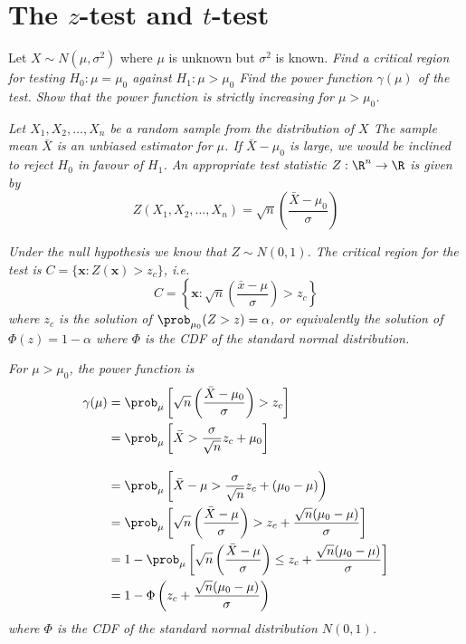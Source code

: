 
\section{The $z$-test and $t$-test}
\begin{example}
Let $X\sim N(\mu,\sigma^2)$ where $\mu$ is unknown but $\sigma^2$ is known. 
\ben
\it Find a critical region for testing $H_0:\mu=\mu_0$ against $H_1:\mu > \mu_0$
\it Find the power function $\gamma(\mu)$ of the test.
\it Show that the power function is strictly increasing for $\mu>\mu_0$.
\een
\end{example}

\begin{solution}
\ben
\it %
Let $X_1,X_2,\ldots,X_n$ be a random sample from the distribution of $X$
\bit
\it The sample mean $\bar{X}$ is an unbiased estimator for $\mu$.
\it If $\bar{X}-\mu_0$ is large, we would be inclined to reject $H_0$ in favour of $H_1$.
\eit
An appropriate test statistic $Z:\R^n\to\R$ is given by
\[
Z(X_1,X_2,\ldots,X_n) = \sqrt{n}\left(\frac{\bar{X}-\mu_0}{\sigma}\right)
\]

\bit
\it Under the null hypothesis we know that $Z\sim N(0,1)$. 
\eit
The critical region for the test is
$C=\{\mathbf{x}:Z(\mathbf{x})> z_c\}$, i.e.
\[
C=\left\{\mathbf{x}: \sqrt{n}\left(\frac{\bar{x}-\mu}{\sigma}\right) > z_c\right\}
\]
where $z_c$ is the solution of $\prob_{\mu_0}(Z > z)=\alpha$, or equivalently the solution of $\Phi(z)=1-\alpha$ where $\Phi$ is the CDF of the standard normal distribution.


\it %
For $\mu > \mu_0$, the power function is
\begin{align*}
\gamma(\mu) 
	& = \prob_{\mu}\left[\sqrt{n}\left(\frac{\bar{X}-\mu_0}{\sigma}\right) > z_c\right] \\
	& = \prob_{\mu}\left[\bar{X} > \frac{\sigma}{\sqrt{n}}z_c+\mu_0\right] \\
\intertext{}
	& = \prob_{\mu}\left[\bar{X}-\mu > \frac{\sigma}{\sqrt{n}}z_c + (\mu_0-\mu)\right) \\
	& = \prob_{\mu}\left[\sqrt{n}\left(\frac{\bar{X}-\mu}{\sigma}\right) > z_c + \frac{\sqrt{n}(\mu_0-\mu)}{\sigma}\right] \\
	& = 1 - \prob_{\mu}\left[\sqrt{n}\left(\frac{\bar{X}-\mu}{\sigma}\right) \leq z_c + \frac{\sqrt{n}(\mu_0-\mu)}{\sigma}\right] \\
	& = 1 - \Phi\left(z_c + \frac{\sqrt{n}(\mu_0-\mu)}{\sigma}\right)
\end{align*}	
where $\Phi$ is the CDF of the standard normal distribution $N(0,1)$.


\end{solution}

